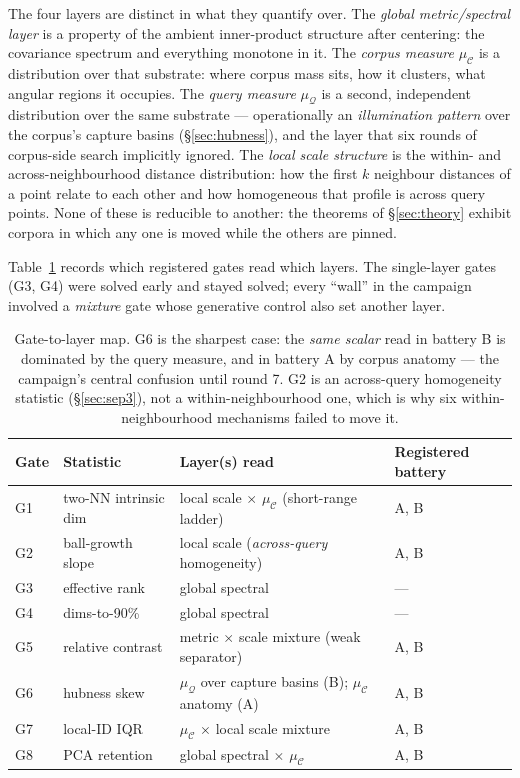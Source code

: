 \documentclass[11pt]{article}
\newcommand{\muC}{\mu_{\mathcal{C}}}
\newcommand{\muQ}{\mu_{\mathcal{Q}}}
\begin{document}
The four layers are distinct in what they quantify over. The \emph{global
metric/spectral layer} is a property of the ambient inner-product structure
after centering: the covariance spectrum and everything monotone in it. The
\emph{corpus measure} $\muC$ is a distribution over that substrate: where
corpus mass sits, how it clusters, what angular regions it occupies. The
\emph{query measure} $\muQ$ is a second, independent distribution over the
same substrate --- operationally an \emph{illumination pattern} over the
corpus's capture basins (\S\ref{sec:hubness}), and the layer that six rounds
of corpus-side search implicitly ignored. The \emph{local scale structure} is
the within- and across-neighbourhood distance distribution: how the first $k$
neighbour distances of a point relate to each other and how homogeneous that
profile is across query points. None of these is reducible to another: the
theorems of \S\ref{sec:theory} exhibit corpora in which any one is moved
while the others are pinned.

Table~\ref{tab:gatemap} records which registered gates read which layers.
The single-layer gates (G3, G4) were solved early and stayed solved; every
``wall'' in the campaign involved a \emph{mixture} gate whose generative
control also set another layer.

\begin{table}[h]\centering\small
\begin{tabular}{llll}
\toprule
Gate & Statistic & Layer(s) read & Registered battery \\
\midrule
G1 & two-NN intrinsic dim & local scale $\times$ $\muC$ (short-range ladder) & A, B \\
G2 & ball-growth slope & local scale (\emph{across-query} homogeneity) & A, B \\
G3 & effective rank & global spectral & --- \\
G4 & dims-to-90\% & global spectral & --- \\
G5 & relative contrast & metric $\times$ scale mixture (weak separator) & A, B \\
G6 & hubness skew & $\muQ$ over capture basins (B); $\muC$ anatomy (A) & A, B \\
G7 & local-ID IQR & $\muC$ $\times$ local scale mixture & A, B \\
G8 & PCA retention & global spectral $\times$ $\muC$ & A, B \\
\bottomrule
\end{tabular}
\caption{Gate-to-layer map. G6 is the sharpest case: the \emph{same scalar}
read in battery B is dominated by the query measure, and in battery A by
corpus anatomy --- the campaign's central confusion until round 7. G2 is an
across-query homogeneity statistic (\S\ref{sec:sep3}), not a
within-neighbourhood one, which is why six within-neighbourhood mechanisms
failed to move it.}
\label{tab:gatemap}
\end{table}
\end{document}
